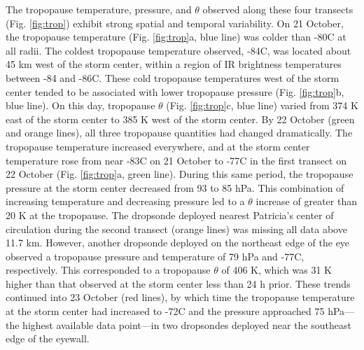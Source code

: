 The tropopause temperature, pressure, and $\theta$ observed along these four transects (Fig. \ref{fig:trop}) exhibit strong spatial and temporal variability.
On 21 October, the tropopause temperature (Fig. \ref{fig:trop}a, blue line) was colder than -80\textdegree{}C at all radii.
The coldest tropopause temperature observed, -84\textdegree{}C, was located about 45 km west of the storm center, within a region of IR brightness temperatures between -84\textdegree{} and -86\textdegree{}C.
These cold tropopause temperatures west of the storm center tended to be associated with lower tropopause pressure (Fig. \ref{fig:trop}b, blue line).
On this day, tropopause $\theta$ (Fig. \ref{fig:trop}c, blue line) varied from 374 K east of the storm center to 385 K west of the storm center.
By 22 October (green and orange lines), all three tropopause quantities had changed dramatically.
The tropopause temperature increased everywhere, and at the storm center temperature rose from near -83\textdegree{}C on 21 October to -77\textdegree{}C in the first transect on 22 October (Fig. \ref{fig:trop}a, green line).
During this same period, the tropopause pressure at the storm center decreased from 93 to 85 hPa.
This combination of increasing temperature and decreasing pressure led to a $\theta$ increase of greater than 20 K at the tropopause.
The dropsonde deployed nearest Patricia’s center of circulation during the second transect (orange lines) was missing all data above 11.7 km.
However, another dropsonde deployed on the northeast edge of the eye observed a tropopause pressure and temperature of 79 hPa and -77\textdegree{}C, respectively.
This corresponded to a tropopause $\theta$ of 406 K, which was 31 K higher than that observed at the storm center less than 24 h prior.
These trends continued into 23 October (red lines), by which time the tropopause temperature at the storm center had increased to -72\textdegree{}C and the pressure approached 75 hPa---the highest available data point---in two dropsondes deployed near the southeast edge of the eyewall.

